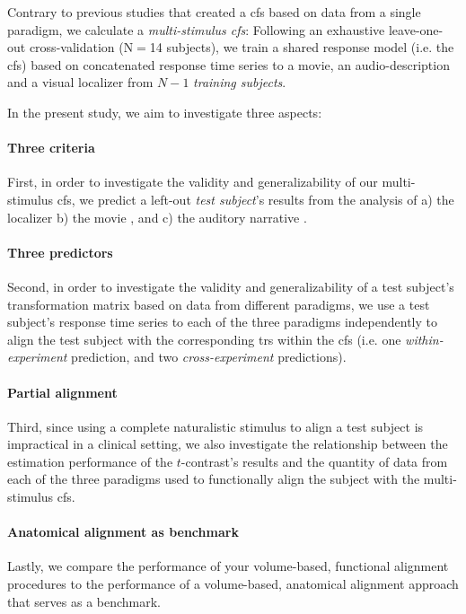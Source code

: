 Contrary to previous studies \citep[e.g.][]{jiahui2020predicting,
guntupalli2016model, haxby2011common} that created a \ac{cfs} based on data from
a single paradigm, we calculate a \textit{multi-stimulus \ac{cfs}}:
%
Following an exhaustive leave-one-out cross-validation (N$=$14 subjects), we
train a shared response model (i.e. the \ac{cfs}) based on concatenated
response time series to a movie, an audio-description and a visual
localizer from $N-1$ \textit{training subjects}.
%


In the present study, we aim to investigate three aspects:


\paragraph{Three criteria}
%
First, in order to investigate the validity and generalizability of our
multi-stimulus \ac{cfs}, we predict a left-out \textit{test subject}'s results
from the analysis of
%
a) the localizer \citep{sengupta2016extension}
%
b) the movie \citep{haeusler2022processing}, and
%
c) the auditory narrative \citep{haeusler2022processing}.


\paragraph{Three predictors}
%
Second, in order to investigate the validity and generalizability of a test
subject's transformation matrix based on data from different paradigms, we use a
test subject's response time series to each of the three paradigms independently
to align the test subject with the corresponding \acp{tr} within the \ac{cfs}
(i.e. one \textit{within-experiment} prediction, and two
\textit{cross-experiment} predictions).


\paragraph{Partial alignment}
%
Third, since using a complete naturalistic stimulus to align a test subject is
impractical in a clinical setting, we also investigate the relationship between
the estimation performance of the $t$-contrast's results and the quantity of
data from each of the three paradigms used to functionally align the subject
with the multi-stimulus \ac{cfs}.


\paragraph{Anatomical alignment as benchmark}
%
Lastly, we compare the performance of your volume-based, functional alignment
procedures to the performance of a volume-based, anatomical alignment
approach that serves as a benchmark.




